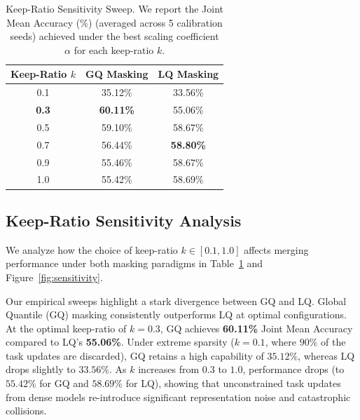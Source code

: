 \begin{table}[ht]
\caption{Keep-Ratio Sensitivity Sweep. We report the Joint Mean Accuracy (\%) (averaged across 5 calibration seeds) achieved under the best scaling coefficient $\alpha$ for each keep-ratio $k$.}
\label{tab:sensitivity}
\vskip 0.15in
\begin{center}
\begin{scriptsize}
\begin{sc}
\setlength{\tabcolsep}{3.5pt}
\begin{tabular}{ccc}
\toprule
Keep-Ratio $k$ & GQ Masking & LQ Masking \\
\midrule
0.1 & 35.12\% & 33.56\% \\
\textbf{0.3} & \textbf{60.11\%} & 55.06\% \\
0.5 & 59.10\% & 58.67\% \\
0.7 & 56.44\% & \textbf{58.80\%} \\
0.9 & 55.46\% & 58.67\% \\
1.0 & 55.42\% & 58.69\% \\
\bottomrule
\end{tabular}
\end{sc}
\end{scriptsize}
\end{center}
\vskip -0.1in
\end{table}

\subsection{Keep-Ratio Sensitivity Analysis}
\label{subsec:sensitivity}
We analyze how the choice of keep-ratio $k \in [0.1, 1.0]$ affects merging performance under both masking paradigms in Table~\ref{tab:sensitivity} and Figure~\ref{fig:sensitivity}.

Our empirical sweeps highlight a stark divergence between GQ and LQ. Global Quantile (GQ) masking consistently outperforms LQ at optimal configurations. At the optimal keep-ratio of $k=0.3$, GQ achieves \textbf{60.11\%} Joint Mean Accuracy compared to LQ's \textbf{55.06\%}. Under extreme sparsity ($k=0.1$, where $90\%$ of the task updates are discarded), GQ retains a high capability of $35.12\%$, whereas LQ drops slightly to $33.56\%$. As $k$ increases from $0.3$ to $1.0$, performance drops (to $55.42\%$ for GQ and $58.69\%$ for LQ), showing that unconstrained task updates from dense models re-introduce significant representation noise and catastrophic collisions.


